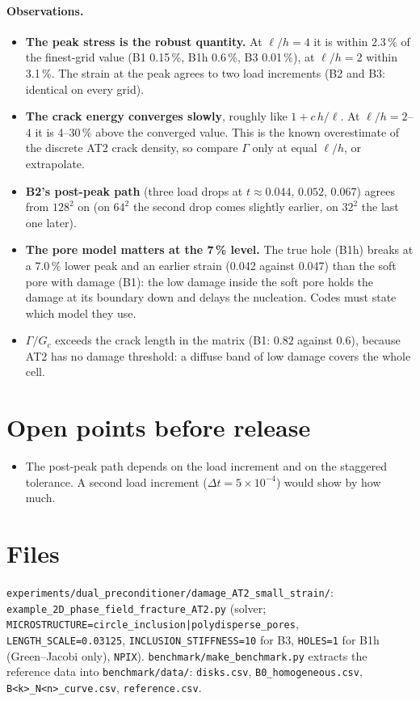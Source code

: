 \documentclass[11pt]{article}
\begin{document}
\paragraph{Observations.}
\begin{itemize}
  \item \textbf{The peak stress is the robust quantity.} At $\ell/h = 4$ it is within 2.3\,\% of the finest-grid value
        (B1 0.15\,\%, B1h 0.6\,\%, B3 0.01\,\%), at $\ell/h = 2$ within 3.1\,\%. The strain at the peak agrees to two load
        increments (B2 and B3: identical on every grid).
  \item \textbf{The crack energy converges slowly}, roughly like $1 + c\,h/\ell$. At $\ell/h = 2$--$4$ it is 4--30\,\%
        above the converged value. This is the known overestimate of the discrete AT2 crack density, so compare
        $\Gamma$ only at equal $\ell/h$, or extrapolate.
  \item \textbf{B2's post-peak path} (three load drops at $t \approx 0.044$, $0.052$, $0.067$) agrees from $128^2$ on (on $64^2$ the
        second drop comes slightly earlier, on $32^2$ the last one later).
  \item \textbf{The pore model matters at the 7\,\% level.} The true hole (B1h) breaks at a 7.0\,\% lower peak and an
        earlier strain (0.042 against 0.047) than the soft pore with damage (B1): the low damage inside the soft pore
        holds the damage at its boundary down and delays the nucleation. Codes must state which model they use.
  \item $\Gamma/G_c$ exceeds the crack length in the matrix (B1: $0.82$ against $0.6$), because AT2 has no damage
        threshold: a diffuse band of low damage covers the whole cell.
\end{itemize}

\section*{Open points before release}
\begin{itemize}
  \item The post-peak path depends on the load increment and on the staggered tolerance. A second load increment
        ($\Delta t = 5\times10^{-4}$) would show by how much.
\end{itemize}

\section*{Files}
\texttt{experiments/dual\_preconditioner/damage\_AT2\_small\_strain/}: \texttt{example\_2D\_phase\_field\_fracture\_AT2.py}
(solver; \texttt{MICROSTRUCTURE=circle\_inclusion|polydisperse\_pores}, \texttt{LENGTH\_SCALE=0.03125},
\texttt{INCLUSION\_STIFFNESS=10} for B3, \texttt{HOLES=1} for B1h (Green--Jacobi only), \texttt{NPIX}). \texttt{benchmark/make\_benchmark.py} extracts the reference data
into \texttt{benchmark/data/}: \texttt{disks.csv}, \texttt{B0\_homogeneous.csv}, \texttt{B<k>\_N<n>\_curve.csv},
\texttt{reference.csv}.
\end{document}

